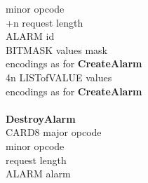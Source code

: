 \begin{tabbing}
				\> minor opcode \\
		+n		\> request length \\
		\> ALARM	\> id \\
		\> BITMASK	\> values mask \\
	\> 	\> encodings as for {\bf CreateAlarm}\\
	\> 4n	\> LISTofVALUE	\> values\\
	\>	\> encodings as for {\bf CreateAlarm}\\
\\
{\bf DestroyAlarm}\\
		\> CARD8	\> major opcode \\
	\> 1			\> minor opcode\footnotemark[1] \\
	\> 2			\> request length \\
		\> ALARM	\> alarm
\end{tabbing}
\setlength{\topsep}{0pt}	%
